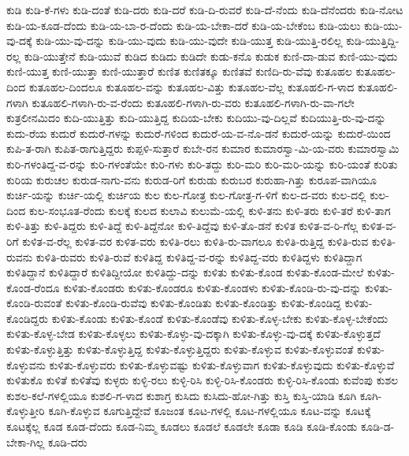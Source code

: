{ಕುಡಿ
ಕುಡಿ-ಕೆ-ಗಳು
ಕುಡಿ-ದಂತೆ
ಕುಡಿ-ದರು
ಕುಡಿ-ದರೆ
ಕುಡಿ-ದಿ-ರುವರೆ
ಕುಡಿ-ದೆ-ನೆಂದು
ಕುಡಿ-ದೆನೆಂದರು
ಕುಡಿ-ನೋಟ
ಕುಡಿ-ಯ-ಕೂಡ-ದೆಂದು
ಕುಡಿ-ಯ-ಬಾ-ರ-ದೆಂದು
ಕುಡಿ-ಯ-ಬೇಕಾ-ದರೆ
ಕುಡಿ-ಯ-ಬೇಕೆಂಬ
ಕುಡಿ-ಯಲು
ಕುಡಿ-ಯು-ವು-ದಕ್ಕೆ
ಕುಡಿ-ಯು-ವು-ದನ್ನು
ಕುಡಿ-ಯು-ವುದು
ಕುಡಿ-ಯು-ವುದೇ
ಕುಡಿ-ಯುತ್ತ
ಕುಡಿ-ಯುತ್ತಿ-ರಲಿಲ್ಲ
ಕುಡಿ-ಯುತ್ತಿದ್ದಿ-ರಲ್ಲ
ಕುಡಿ-ಯುತ್ತೇನೆ
ಕುಡಿ-ಯುವೆ
ಕುಡಿದ
ಕುಡಿದು
ಕುಡಿದೇ
ಕುಡು-ಕನೊ
ಕುಡುಕ
ಕುಣಿ-ದಾ-ಡುವ
ಕುಣಿ-ಯು-ವುದು
ಕುಣಿ-ಯುತ್ತ
ಕುಣಿ-ಯುತ್ತಾ
ಕುಣಿ-ಯುತ್ತಾರೆ
ಕುಣಿತ
ಕುಣಿತಕ್ಕೂ
ಕುಣಿತವೆ
ಕುಣಿದಿ-ರು-ವೆವು
ಕುತೂಹಲ
ಕುತೂಹಲ-ದಿಂದ
ಕುತೂಹಲ-ದಿಂದಲೂ
ಕುತೂಹಲ-ವನ್ನು
ಕುತೂಹಲ-ವಿತ್ತು
ಕುತೂಹಲ-ವೆಲ್ಲ
ಕುತೂಹಲಿ-ಗ-ಳಾದ
ಕುತೂಹಲಿ-ಗಳಾಗಿ
ಕುತೂಹಲಿ-ಗಳಾಗಿ-ರು-ವ-ರೆಂದು
ಕುತೂಹಲಿ-ಗಳಾಗಿ-ರು-ವರು
ಕುತೂಹಲಿ-ಗಳಾಗಿ-ರು-ವಾ-ಗಲೇ
ಕುತ್ರಲೀನಮಿದಂ
ಕುದಿ-ಯುತ್ತಿತ್ತು
ಕುದಿ-ಯುತ್ತಿದ್ದ
ಕುದಿಯ-ಬೇಕು
ಕುದಿಯು-ವು-ದಿಲ್ಲವೆ
ಕುದಿಯುತ್ತಿ-ರು-ವು-ದನ್ನು
ಕುದು-ರೆಯ
ಕುದುರೆ
ಕುದುರೆ-ಗಳನ್ನು
ಕುದುರೆ-ಗಳಿಂದ
ಕುದುರೆ-ಯ-ವ-ನೊ-ಡನೆ
ಕುದುರೆ-ಯನ್ನು
ಕುದುರೆ-ಯಿಂದ
ಕುಪಿ-ತ-ರಾಗಿ
ಕುಪಿತ-ರಾಗುತ್ತಿದ್ದರು
ಕುಪ್ಪಳಿ-ಸುತ್ತಾರೆ
ಕುಬೇ-ರನ
ಕುಮಾರ
ಕುಮಾರಸ್ವಾ-ಮಿ-ಯ-ವರು
ಕುಮಾರಸ್ವಾಮಿ
ಕುರಿ-ಗಳಂತಿದ್ದ-ವ-ರನ್ನು
ಕುರಿ-ಗಳಂತೆಯೇ
ಕುರಿ-ಗಳು
ಕುರಿ-ತದ್ದು
ಕುರಿ-ಮರಿ
ಕುರಿ-ಮರಿ-ಯನ್ನು
ಕುರಿ-ಯಂತೆ
ಕುರಿತು
ಕುರಿಯ
ಕುರುಚಲ
ಕುರುಡ-ನಾಗು-ವನು
ಕುರುಡ-ರಿಗೆ
ಕುರುಡು
ಕುರುಬರ
ಕುರುಹಾ-ಗಿತ್ತು
ಕುರೂಪ-ವಾಗಿಯೂ
ಕುರ್ಚಿ-ಯನ್ನು
ಕುರ್ಚಿ-ಯಲ್ಲಿ
ಕುರ್ಚಿಯ
ಕುಲ
ಕುಲ-ಗೋತ್ರ
ಕುಲ-ಗೋತ್ರ-ಗ-ಳಿಗೆ
ಕುಲ-ದ-ವರು
ಕುಲ-ದಲ್ಲಿ
ಕುಲ-ದಿಂದ
ಕುಲ-ಸಂಭೂತ-ರೆಂದು
ಕುಲಕ್ಕೆ
ಕುಲದ
ಕುಲಾವಿ
ಕುಲುಮೆ-ಯಲ್ಲಿ
ಕುಳಿ-ತನು
ಕುಳಿ-ತರು
ಕುಳಿ-ತರೆ
ಕುಳಿ-ತಾಗ
ಕುಳಿ-ತಿತ್ತು
ಕುಳಿ-ತಿದ್ದರು
ಕುಳಿ-ತಿದ್ದೆ
ಕುಳಿ-ತಿದ್ದೆನೋ
ಕುಳಿ-ತಿದ್ದೆವು
ಕುಳಿ-ತೊ-ಡನೆ
ಕುಳಿತ
ಕುಳಿತ-ವ-ರಿ-ಗೆಲ್ಲ
ಕುಳಿತ-ವ-ರಿಗೆ
ಕುಳಿತ-ವ-ರೆಲ್ಲ
ಕುಳಿತ-ವರ
ಕುಳಿತ-ವರು
ಕುಳಿತಿ-ರಲು
ಕುಳಿತಿ-ರು-ವಾಗಲೂ
ಕುಳಿತಿ-ರುತ್ತಿದ್ದ
ಕುಳಿತಿ-ರುವ
ಕುಳಿತಿ-ರುವನು
ಕುಳಿತಿ-ರುವರು
ಕುಳಿತಿ-ರುವೆ
ಕುಳಿತಿದ್ದ
ಕುಳಿತಿದ್ದ-ವ-ರನ್ನು
ಕುಳಿತಿದ್ದ-ವರು
ಕುಳಿತಿದ್ದಳು
ಕುಳಿತಿದ್ದಾಗ
ಕುಳಿತಿದ್ದಾನೆ
ಕುಳಿತಿದ್ದಾರೆ
ಕುಳಿತಿದ್ದೀಯೋ
ಕುಳಿತಿದ್ದು-ದನ್ನು
ಕುಳಿತು
ಕುಳಿತು-ಕೊಂಡ
ಕುಳಿತು-ಕೊಂಡ-ಮೇಲೆ
ಕುಳಿತು-ಕೊಂಡ-ರೆಂದೂ
ಕುಳಿತು-ಕೊಂಡರು
ಕುಳಿತು-ಕೊಂಡರೂ
ಕುಳಿತು-ಕೊಂಡಳು
ಕುಳಿತು-ಕೊಂಡಿ-ರು-ವು-ದನ್ನು
ಕುಳಿತು-ಕೊಂಡಿ-ರುವಂತೆ
ಕುಳಿತು-ಕೊಂಡಿ-ರುವೆವು
ಕುಳಿತು-ಕೊಂಡಿತು
ಕುಳಿತು-ಕೊಂಡಿತ್ತು
ಕುಳಿತು-ಕೊಂಡಿದ್ದ
ಕುಳಿತು-ಕೊಂಡಿದ್ದರು
ಕುಳಿತು-ಕೊಂಡು
ಕುಳಿತು-ಕೊಂಡೆ
ಕುಳಿತು-ಕೊಂಡೆವು
ಕುಳಿತು-ಕೊಳ್ಳ-ಬೇಕು
ಕುಳಿತು-ಕೊಳ್ಳ-ಬೇಕೆಂದು
ಕುಳಿತು-ಕೊಳ್ಳ-ಬೇಡ
ಕುಳಿತು-ಕೊಳ್ಳಲು
ಕುಳಿತು-ಕೊಳ್ಳು-ವು-ದಕ್ಕಾಗಿ
ಕುಳಿತು-ಕೊಳ್ಳು-ವು-ದಕ್ಕೆ
ಕುಳಿತು-ಕೊಳ್ಳುತ್ತದೆ
ಕುಳಿತು-ಕೊಳ್ಳುತ್ತಿತ್ತು
ಕುಳಿತು-ಕೊಳ್ಳುತ್ತಿದ್ದ
ಕುಳಿತು-ಕೊಳ್ಳುತ್ತಿದ್ದರು
ಕುಳಿತು-ಕೊಳ್ಳುವ
ಕುಳಿತು-ಕೊಳ್ಳುವಂತೆ
ಕುಳಿತು-ಕೊಳ್ಳುವನು
ಕುಳಿತು-ಕೊಳ್ಳುವರು
ಕುಳಿತು-ಕೊಳ್ಳುವಷ್ಟು
ಕುಳಿತು-ಕೊಳ್ಳುವಾಗ
ಕುಳಿತು-ಕೊಳ್ಳುವುದು
ಕುಳಿತು-ಕೊಳ್ಳುವೆ
ಕುಳಿತುಕೊ
ಕುಳಿತೆ
ಕುಳಿತೆವು
ಕುಳ್ಳರು
ಕುಳ್ಳಿ-ರಲು
ಕುಳ್ಳಿ-ರಿಸಿ
ಕುಳ್ಳಿ-ರಿಸಿ-ಕೊಂಡರು
ಕುಳ್ಳಿ-ರಿಸಿ-ಕೊಂಡು
ಕುವೆಂಪು
ಕುಶಲ
ಕುಶಲ-ಕಲೆ-ಗಳಲ್ಲಿಯೂ
ಕುಶಲಿ-ಗ-ಳಾದ
ಕುಶಾಗ್ರ
ಕುಸಿದು
ಕುಸಿದು-ಹೋ-ಗಿತ್ತು
ಕುಸ್ತಿ
ಕುಸ್ತಿ-ಯಾಡಿ
ಕೂಗಿ
ಕೂಗಿ-ಕೊಳ್ಳುತ್ತೀರಿ
ಕೂಗಿ-ಕೊಳ್ಳುವ
ಕೂಗುತ್ತಿದ್ದೇವೆ
ಕೂಜಂತ
ಕೂಟ-ಗಳಲ್ಲಿ
ಕೂಟ-ಗಳಲ್ಲಿಯೂ
ಕೂಟ-ವನ್ನು
ಕೂಟಕ್ಕೆ
ಕೂಟಕ್ಕೆಲ್ಲ
ಕೂಡ
ಕೂಡ-ದೆಂದು
ಕೂಡ-ನಿಮ್ಮ
ಕೂಡಲು
ಕೂಡಲೆ
ಕೂಡಲೇ
ಕೂಡಾ
ಕೂಡಿ
ಕೂಡಿ-ಕೊಂಡು
ಕೂಡಿ-ಡ-ಬೇಕಾ-ಗಿಲ್ಲ
ಕೂಡಿ-ದರು
}
